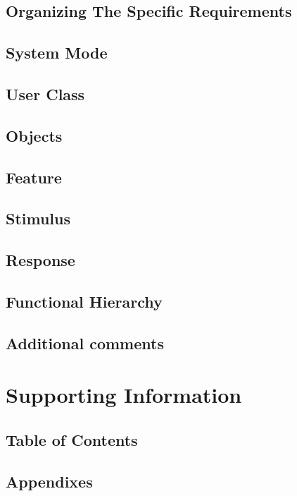 \documentclass[draftclsnofoot, onecolumn, 10pt]{IEEEtran}
\begin{document}
\subsection{Organizing The Specific Requirements}

\subsection{System Mode}

\subsection{User Class}

\subsection{Objects}

\subsection{Feature}

\subsection{Stimulus}

\subsection{Response}

\subsection{Functional Hierarchy}

\subsection{Additional comments}

\section{Supporting Information}

\subsection{Table of Contents}

\subsection{Appendixes}
\end{document}

